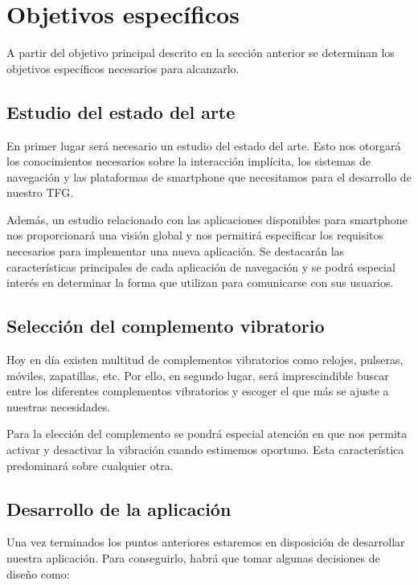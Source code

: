 \section{Objetivos específicos}

A partir del objetivo principal descrito en la sección anterior se determinan los objetivos
específicos necesarios para alcanzarlo.

\subsection{Estudio del estado del arte}

En primer lugar será necesario un estudio del estado del arte. Esto nos otorgará los conocimientos
necesarios sobre la interacción implícita, los sistemas de navegación y las plataformas de
smartphone que necesitamos para el desarrollo de nuestro \acs{TFG}.

Además, un estudio relacionado con las aplicaciones disponibles para smartphone nos proporcionará
una visión global y nos permitirá especificar los requisitos necesarios para implementar una nueva
aplicación. Se destacarán las características principales de cada aplicación de navegación y se
podrá especial interés en determinar la forma que utilizan para comunicarse con sus usuarios.

\subsection{Selección del complemento vibratorio}

Hoy en día existen multitud de complementos vibratorios como relojes, pulseras, móviles, zapatillas,
etc. Por ello, en segundo lugar, será imprescindible buscar entre los diferentes complementos
vibratorios y escoger el que más se ajuste a nuestras necesidades.

Para la elección del complemento se pondrá especial atención en que nos permita activar y desactivar
la vibración cuando estimemos oportuno. Esta característica predominará sobre cualquier otra.

\subsection{Desarrollo de la aplicación}

Una vez terminados los puntos anteriores estaremos en disposición de desarrollar nuestra aplicación.
Para conseguirlo, habrá que tomar algunas decisiones de diseño como:

